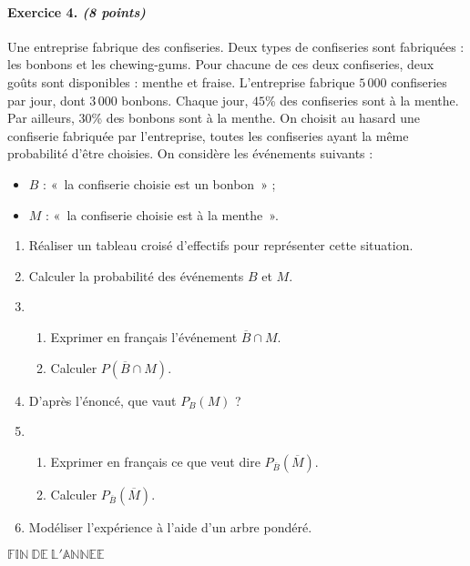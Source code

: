 \documentclass[11pt]{article}
\begin{document}
\paragraph{Exercice 4. \emph{(8 points)}} %
Une entreprise fabrique des confiseries. Deux types de confiseries sont
fabriquées : les bonbons et les chewing-gums. Pour chacune de ces deux
confiseries, deux goûts sont disponibles : menthe et fraise. L'entreprise
fabrique $5\,000$ confiseries par jour, dont $3\,000$ bonbons. Chaque jour,
$45$\% des confiseries sont à la menthe. Par ailleurs, $30$\% des bonbons sont à
la menthe. On choisit au hasard une confiserie fabriquée par l'entreprise,
toutes les confiseries ayant la même probabilité d'être choisies. On considère
les événements suivants :
\begin{itemize}
  \item $B$ : «~la confiserie choisie est un bonbon~» ;
  \item $M$ : «~la confiserie choisie est à la menthe~».
\end{itemize}
\begin{enumerate}
  \item Réaliser un tableau croisé d'effectifs pour représenter cette situation.
  \item Calculer la probabilité des événements $B$ et $M$.
  \item \begin{enumerate}
      \item Exprimer en français l'événement $\overline B\cap M$.
      \item Calculer $P\left( \overline B\cap M \right)$.
    \end{enumerate}
  \item D'après l'énoncé, que vaut $P_B(M)$ ?
  \item \begin{enumerate}
      \item Exprimer en français ce que veut dire $P_{\overline B}(\overline
        M)$.
      \item Calculer $P_{\overline B}(\overline M)$.
    \end{enumerate}
  \item Modéliser l'expérience à l'aide d'un arbre pondéré.
\end{enumerate}
\vspace{5cm}
\begin{center}
  \Huge
  $\mathbb{FIN~DE~L'ANNEE}$
\end{center}
\end{document}
